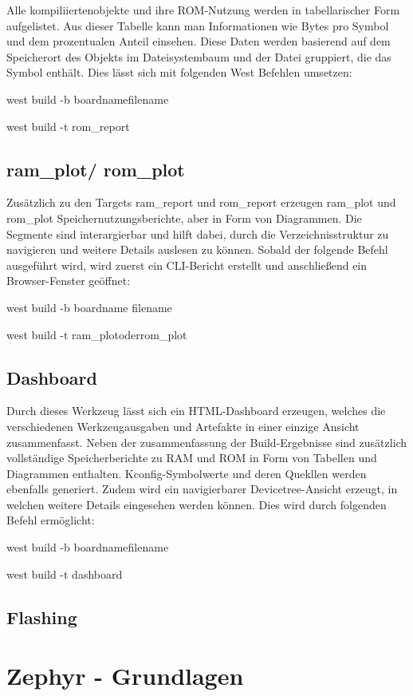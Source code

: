Alle kompiliiertenobjekte und ihre ROM-Nutzung werden in tabellarischer Form aufgelistet. Aus dieser Tabelle kann man Informationen wie Bytes pro Symbol und dem prozentualen Anteil einsehen. Diese Daten werden basierend auf dem Speicherort des Objekts im Dateisystembaum und der Datei gruppiert, die das Symbol enthält. Dies lässt sich mit folgenden West Befehlen umsetzen:

west build -b boardnamefilename

west build -t rom\_report

\subsection{ram\_plot/ rom\_plot}

Zusätzlich zu den Targets ram\_report und rom\_report erzeugen ram\_plot und rom\_plot Speichernutzungsberichte, aber in Form von Diagrammen. Die Segmente sind interargierbar und hilft dabei, durch die Verzeichnisstruktur zu navigieren und weitere Details auslesen zu können. Sobald der folgende Befehl ausgeführt wird, wird zuerst ein CLI-Bericht erstellt und anschließend ein Browser-Fenster geöffnet:

west build -b boardname filename

west build -t ram\_plotoderrom\_plot

\subsection{Dashboard}

Durch dieses Werkzeug lässt sich ein HTML-Dashboard erzeugen, welches die verschiedenen Werkzeugausgaben und Artefakte in einer einzige Ansicht zusammenfasst. Neben der zusammenfassung der Build-Ergebnisse sind zusätzlich vollständige Speicherberichte zu RAM und ROM in Form von Tabellen und Diagrammen enthalten. Kconfig-Symbolwerte und deren Quekllen werden ebenfalls generiert. Zudem wird ein navigierbarer Devicetree-Ansicht erzeugt, in welchen weitere Details eingesehen werden können. Dies wird durch folgenden Befehl ermöglicht:

west build -b boardnamefilename

west build -t dashboard

\subsection{Flashing}

\section{Zephyr - Grundlagen}

